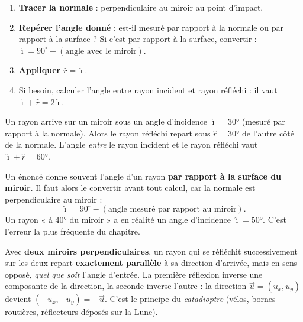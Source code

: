 \documentclass[11pt,a4paper]{article}
\newcommand{\vv}[1]{\vec{#1}}\newcommand{\ds}{\displaystyle}
\begin{document}
\begin{methode}
\begin{enumerate}[leftmargin=1.7em,topsep=2pt,itemsep=1pt]
  \item \textbf{Tracer la normale} : perpendiculaire au miroir au point d'impact.
  \item \textbf{Repérer l'angle donné} : est-il mesuré par rapport à la normale ou par rapport à la
        surface ? Si c'est par rapport à la surface, convertir : $\hat{\imath}=90^\circ-(\text{angle avec le miroir})$.
  \item \textbf{Appliquer} $\hat{r}=\hat{\imath}$.
  \item Si besoin, calculer l'angle entre rayon incident et rayon réfléchi : il vaut $\hat{\imath}+\hat{r}=2\hat{\imath}$.
\end{enumerate}
\end{methode}

\begin{exemplebox}
Un rayon arrive sur un miroir sous un angle d'incidence $\hat{\imath}=\ang{30}$ (mesuré par rapport à
la normale). Alors le rayon réfléchi repart sous $\hat{r}=\ang{30}$ de l'autre côté de la normale.
L'angle \emph{entre} le rayon incident et le rayon réfléchi vaut $\hat{\imath}+\hat{r}=\ang{60}$.
\end{exemplebox}

\begin{piege}
Un énoncé donne souvent l'angle d'un rayon \textbf{par rapport à la surface du miroir}. Il faut
alors le convertir avant tout calcul, car la normale est perpendiculaire au miroir :
\[ \hat{\imath}=90^\circ-(\text{angle mesuré par rapport au miroir}). \]
Un rayon « à $\ang{40}$ du miroir » a en réalité un angle d'incidence $\hat{\imath}=\ang{50}$.
C'est l'erreur la plus fréquente du chapitre.
\end{piege}

\begin{remarque}
Avec \textbf{deux miroirs perpendiculaires}, un rayon qui se réfléchit successivement sur les deux
repart \textbf{exactement parallèle} à sa direction d'arrivée, mais en sens opposé, \emph{quel que soit}
l'angle d'entrée. La première réflexion inverse une composante de la direction, la seconde inverse
l'autre : la direction $\vv{u}=(u_x,u_y)$ devient $(-u_x,-u_y)=-\vv{u}$. C'est le principe du
\emph{catadioptre} (vélos, bornes routières, réflecteurs déposés sur la Lune).
\end{remarque}
\end{document}
